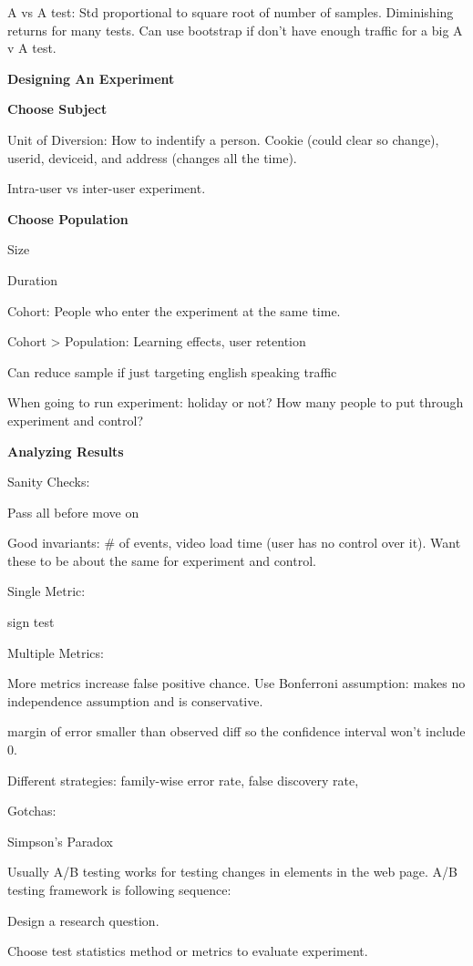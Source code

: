 \documentclass[]{book}
\begin{document}
A vs A test: Std proportional to square root of number of samples.
Diminishing returns for many tests. Can use bootstrap if don't have
enough traffic for a big A v A test.

\textbf{Designing An Experiment}

\textbf{Choose Subject}

Unit of Diversion: How to indentify a person. Cookie (could clear so
change), userid, deviceid, and address (changes all the time).

Intra-user vs inter-user experiment.

\textbf{Choose Population}

Size

Duration

Cohort: People who enter the experiment at the same time.

Cohort \textgreater{} Population: Learning effects, user retention

Can reduce sample if just targeting english speaking traffic

When going to run experiment: holiday or not? How many people to put
through experiment and control?

\textbf{Analyzing Results}

Sanity Checks:

Pass all before move on

Good invariants: \# of events, video load time (user has no control over
it). Want these to be about the same for experiment and control.

Single Metric:

sign test

Multiple Metrics:

More metrics increase false positive chance. Use Bonferroni assumption:
makes no independence assumption and is conservative.

margin of error smaller than observed diff so the confidence interval
won't include 0.

Different strategies: family-wise error rate, false discovery rate,

Gotchas:

Simpson's Paradox

Usually A/B testing works for testing changes in elements in the web
page. A/B testing framework is following sequence:

Design a research question.

Choose test statistics method or metrics to evaluate experiment.
\end{document}
